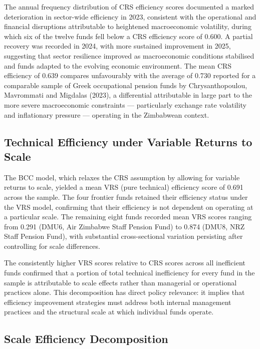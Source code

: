 \documentclass[12pt,a4paper]{article}
\begin{document}
The annual frequency distribution of CRS efficiency scores documented a marked deterioration in sector-wide efficiency in 2023, consistent with the operational and financial disruptions attributable to heightened macroeconomic volatility, during which six of the twelve funds fell below a CRS efficiency score of 0.600. A partial recovery was recorded in 2024, with more sustained improvement in 2025, suggesting that sector resilience improved as macroeconomic conditions stabilised and funds adapted to the evolving economic environment. The mean CRS efficiency of 0.639 compares unfavourably with the average of 0.730 reported for a comparable sample of Greek occupational pension funds by Chrysanthopoulou, Mavrommati and Migdalas (2023), a differential attributable in large part to the more severe macroeconomic constraints --- particularly exchange rate volatility and inflationary pressure --- operating in the Zimbabwean context.

\subsection{Technical Efficiency under Variable Returns to Scale}

The BCC model, which relaxes the CRS assumption by allowing for variable returns to scale, yielded a mean VRS (pure technical) efficiency score of 0.691 across the sample. The four frontier funds retained their efficiency status under the VRS model, confirming that their efficiency is not dependent on operating at a particular scale. The remaining eight funds recorded mean VRS scores ranging from 0.291 (DMU6, Air Zimbabwe Staff Pension Fund) to 0.874 (DMU8, NRZ Staff Pension Fund), with substantial cross-sectional variation persisting after controlling for scale differences.

The consistently higher VRS scores relative to CRS scores across all inefficient funds confirmed that a portion of total technical inefficiency for every fund in the sample is attributable to scale effects rather than managerial or operational practices alone. This decomposition has direct policy relevance: it implies that efficiency improvement strategies must address both internal management practices and the structural scale at which individual funds operate.

\subsection{Scale Efficiency Decomposition}
\end{document}
